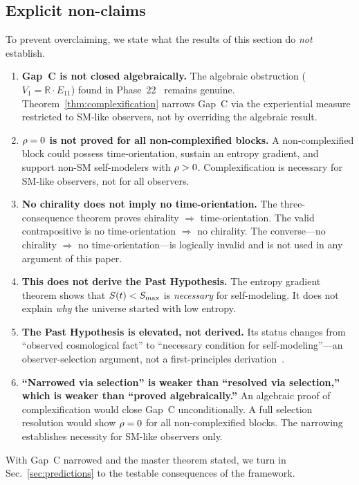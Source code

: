 \subsection{Explicit non-claims}\label{sec:explicit-nonclaims}

To prevent overclaiming, we state what the results of this section
do \emph{not} establish.

\begin{enumerate}
  \item \textbf{Gap~C is not closed algebraically.}
    The algebraic obstruction ($V_1 = \mathbb{R}\cdot E_{11}$) found
    in Phase~22~\cite{BGW2020} remains genuine.
    Theorem~\ref{thm:complexification} narrows Gap~C via the
    experiential measure restricted to SM-like observers, not by
    overriding the algebraic result.

  \item \textbf{$\rho = 0$ is not proved for all non-complexified
    blocks.}
    A non-complexified block could possess time-orientation, sustain
    an entropy gradient, and support non-SM self-modelers with
    $\rho > 0$.  Complexification is necessary for SM-like
    observers, not for all observers.

  \item \textbf{No chirality does not imply no time-orientation.}
    The three-consequence theorem proves chirality $\Rightarrow$
    time-orientation.  The valid contrapositive is
    no time-orientation $\Rightarrow$ no chirality.  The
    converse---no chirality $\Rightarrow$ no time-orientation---is
    logically invalid and is not used in any argument of this paper.

  \item \textbf{This does not derive the Past Hypothesis.}
    The entropy gradient theorem shows that $S(t) < S_{\max}$ is
    \emph{necessary} for self-modeling.  It does not explain
    \emph{why} the universe started with low entropy.

  \item \textbf{The Past Hypothesis is elevated, not derived.}
    Its status changes from ``observed cosmological fact'' to
    ``necessary condition for self-modeling''---an
    observer-selection argument, not a first-principles
    derivation~\cite{Penrose1979,Albert2000}.

  \item \textbf{``Narrowed via selection'' is weaker than ``resolved
    via selection,'' which is weaker than ``proved algebraically.''}
    An algebraic proof of complexification would close Gap~C
    unconditionally.  A full selection resolution would show
    $\rho = 0$ for all non-complexified blocks.  The narrowing
    establishes necessity for SM-like observers only.
\end{enumerate}

\medskip
With Gap~C narrowed and the master theorem stated,
we turn in Sec.~\ref{sec:predictions} to the testable consequences
of the framework.
